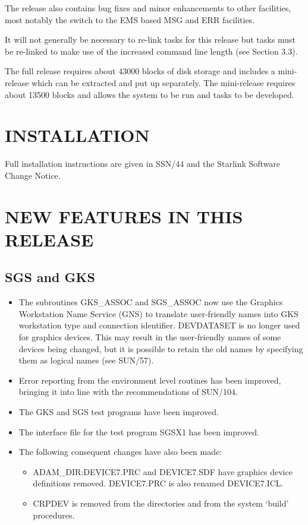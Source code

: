 The release also contains bug fixes and minor enhancements to other facilities,
most notably the switch to the EMS based MSG and ERR facilities.

It will not generally be necessary to re-link tasks for this release but tasks
must be re-linked to make use of the increased command line length (see 
Section 3.3).

The full release requires about 43000 blocks of disk storage and includes a
mini-release which can be extracted and put up separately.
The mini-release requires about 13500 blocks and allows the system to be run
and tasks to be developed.

\section{INSTALLATION}
Full installation instructions are given in SSN/44 and the Starlink Software 
Change Notice.

\section{NEW FEATURES IN THIS RELEASE}

\subsection{SGS and GKS}
\begin{itemize}
\item The subroutines GKS\_ASSOC and SGS\_ASSOC now use the Graphics
Workstation Name Service (GNS) to translate user-friendly names into GKS 
workstation type and connection identifier. 
DEVDATASET is no longer used for graphics devices. 
This may result in the user-friendly names of some devices being changed, but
it is possible to retain the old names by specifying them as logical
names (see SUN/57).
\item Error reporting from the environment level routines has been improved,
bringing it into line with the recommendations of SUN/104.
\item The GKS and SGS test programs have been improved.
\item The interface file for the test program SGSX1 has been improved.
\item The following consequent changes have also been made:
\begin{itemize}
\item ADAM\_DIR:DEVICE7.PRC and DEVICE7.SDF have graphics device definitions
removed.
DEVICE7.PRC is also renamed DEVICE7.ICL.
\item CRPDEV is removed from the directories and from the system `build' 
procedures.
\end{itemize}
\end{itemize}

